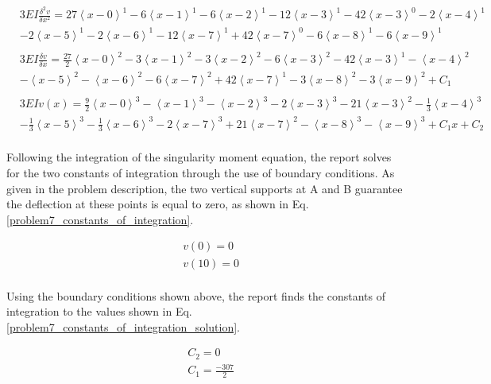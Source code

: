 \documentclass[a4paper]{article}
\begin{document}
\begin{equation}
    \begin{split}
& 3EI \frac{\delta^2 v}{\delta x^2} = 27\left<x-0\right>^1 - 6\left<x-1\right>^1 - 6\left<x-2\right>^1 - 12\left<x-3\right>^1 - 42\left<x-3\right>^0 - 2\left<x-4\right>^1 \\
& - 2\left<x-5\right>^1 - 2\left<x-6\right>^1 - 12\left<x-7\right>^1 + 42\left<x-7\right>^0 - 6\left<x-8\right>^1 - 6\left<x-9\right>^1 \\
& \\
& 3EI \frac{\delta v}{\delta x} = \frac{27}{2}\left<x-0\right>^2 - 3\left<x-1\right>^2 - 3\left<x-2\right>^2 - 6\left<x-3\right>^2 - 42\left<x-3\right>^1 - \left<x-4\right>^2 \\
& - \left<x-5\right>^2 - \left<x-6\right>^2 - 6\left<x-7\right>^2 + 42\left<x-7\right>^1 - 3\left<x-8\right>^2 - 3\left<x-9\right>^2 + C_1 \\
& \\
& 3EI v(x) = \frac{9}{2}\left<x-0\right>^3 - \left<x-1\right>^3 - \left<x-2\right>^3 - 2\left<x-3\right>^3 - 21\left<x-3\right>^2 - \frac{1}{3}\left<x-4\right>^3 \\
& - \frac{1}{3}\left<x-5\right>^3 - \frac{1}{3}\left<x-6\right>^3 - 2\left<x-7\right>^3 + 21\left<x-7\right>^2 - \left<x-8\right>^3 - \left<x-9\right>^3 + C_1x + C_2 \\
    \end{split}
\label{problem7_equations}
\end{equation}

Following the integration of the singularity moment equation, the report solves for the two constants of integration through the use of boundary conditions. As given in the problem description, the two vertical supports at A and B guarantee the deflection at these points is equal to zero, as shown in Eq. \ref{problem7_constants_of_integration}.

\begin{equation}
\begin{split}
	& v(0) = 0 \\
	& v(10) = 0 \\
\end{split}
\label{problem7_constants_of_integration}
\end{equation}

Using the boundary conditions shown above, the report finds the constants of integration to the values shown in Eq. \ref{problem7_constants_of_integration_solution}.

\begin{equation}
\begin{split}
	& C_2 = 0 \\
	& C_1 = \frac{-307}{2} \\
\end{split}
\label{problem7_constants_of_integration_solution}
\end{equation}
\end{document}
